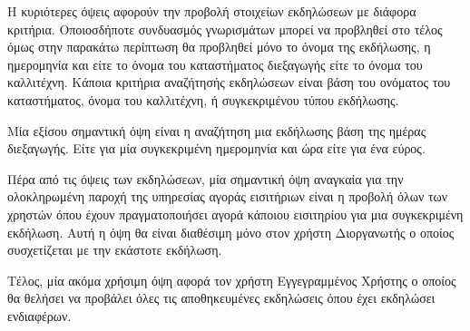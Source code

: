 Η κυριότερες όψεις αφορούν την προβολή στοιχείων εκδηλώσεων με διάφορα
κριτήρια. Οποιοσδήποτε συνδυασμός γνωρισμάτων μπορεί να προβληθεί στο
τέλος όμως στην παρακάτω περίπτωση θα προβληθεί μόνο το όνομα της
εκδήλωσης, η ημερομηνία και είτε το όνομα του καταστήματος διεξαγωγής
είτε το όνομα του καλλιτέχνη. Κάποια κριτήρια αναζήτησής εκδηλώσεων
είναι βάση του ονόματος του καταστήματος, όνομα του καλλιτέχνη, ή
συγκεκριμένου τύπου εκδήλωσης.


Μία εξίσου σημαντική όψη είναι η αναζήτηση μια εκδήλωσης βάση της
ημέρας διεξαγωγής. Είτε για μία συγκεκριμένη ημερομηνία και ώρα είτε
για ένα εύρος.


Πέρα από τις όψεις των εκδηλώσεων, μία σημαντική όψη αναγκαία για την
ολοκληρωμένη παροχή της υπηρεσίας αγοράς εισιτήριων είναι η προβολή
όλων των χρηστών όπου έχουν πραγματοποιήσει αγορά κάποιου εισιτηρίου
για μια συγκεκριμένη εκδήλωση. Αυτή η όψη θα είναι διαθέσιμη μόνο στον
χρήστη Διοργανωτής ο οποίος συσχετίζεται με την εκάστοτε εκδήλωση.


Τέλος, μία ακόμα χρήσιμη όψη αφορά τον χρήστη Εγγεγραμμένος Χρήστης ο
οποίος θα θελήσει να προβάλει όλες τις αποθηκευμένες εκδηλώσεις όπου
έχει εκδηλώσει ενδιαφέρων.



